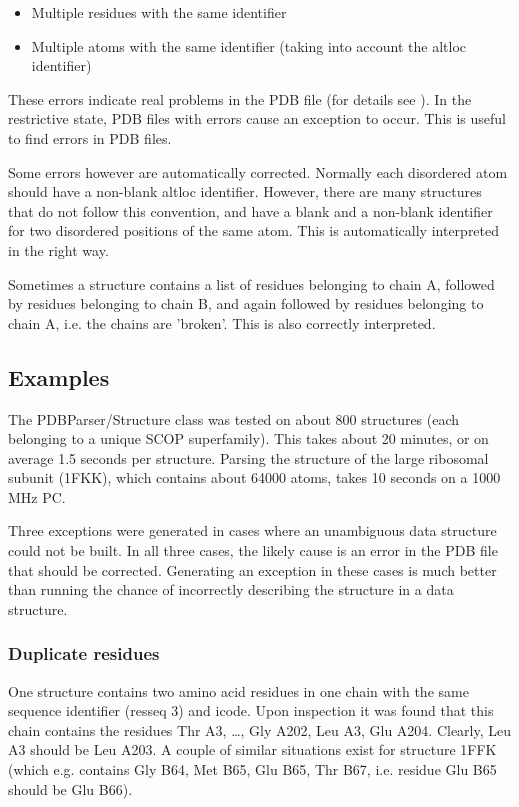 \begin{itemize}
\item Multiple residues with the same identifier
\item Multiple atoms with the same identifier (taking into account the altloc
identifier)
\end{itemize}
These errors indicate real problems in the PDB file (for details see
\cite[Hamelryck and Manderick, 2003]{hamelryck2003a}). In the restrictive state, PDB files with errors cause an exception to occur. This is useful to find errors in PDB files.

Some errors however are automatically corrected. Normally each disordered
atom should have a non-blank altloc identifier. However, there are
many structures that do not follow this convention, and have a blank
and a non-blank identifier for two disordered positions of the same
atom. This is automatically interpreted in the right way.

Sometimes a structure contains a list of residues belonging to chain
A, followed by residues belonging to chain B, and again followed by
residues belonging to chain A, i.e. the chains are 'broken'. This
is also correctly interpreted.

\subsection{Examples}
\label{sec:problem_structures}

The PDBParser/Structure class was tested on about 800 structures (each belonging
to a unique SCOP superfamily). This takes about 20 minutes, or on average 1.5
seconds per structure. Parsing the structure of the large ribosomal subunit
(1FKK), which contains about 64000 atoms, takes 10 seconds on a 1000 MHz PC.

Three exceptions were generated in cases where an unambiguous data structure
could not be built. In all three cases, the likely cause is an error in the
PDB file that should be corrected. Generating an exception in these cases
is much better than running the chance of incorrectly describing
the structure in a data structure.

\subsubsection{Duplicate residues}

One structure contains two amino acid residues in one chain with the same sequence
identifier (resseq 3) and icode. Upon inspection it was found that this chain
contains the residues Thr A3, \ldots, Gly A202, Leu A3, Glu A204. Clearly,
Leu A3 should be Leu A203. A couple of similar situations exist for structure
1FFK (which e.g. contains Gly B64, Met B65, Glu B65, Thr B67, i.e. residue Glu
B65 should be Glu B66).

